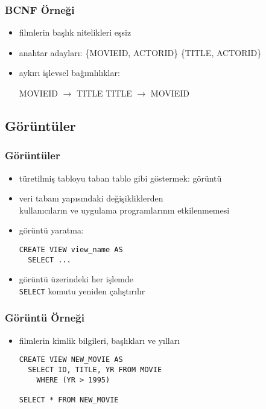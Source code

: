 \documentclass[dvipsnames]{beamer}
\theoremstyle{theorem}
\begin{document}
\begin{frame}
  \frametitle{BCNF Örneği}
  \hyperlink{example_db_1}{}

     \begin{itemize}  
       \item filmlerin başlık nitelikleri eşsiz
       \item anahtar adayları:
          \{MOVIEID, ACTORID\}
          \{TITLE, ACTORID\}
 

      \pause
      \medskip
      \item aykırı işlevsel bağımlılıklar:
 
         MOVIEID $\rightarrow$ TITLE
         TITLE $\rightarrow$ MOVIEID
    \end{itemize}
\end{frame}

\subsection{Görüntüler}

\lstset{language=ExtendedSQL}

\begin{frame}[fragile]
  \frametitle{Görüntüler}

  \begin{itemize}
    \item türetilmiş tabloyu taban tablo gibi göstermek: \alert{görüntü}
    \item veri tabanı yapısındaki değişikliklerden\\
      kullanıcıların ve uygulama programlarının etkilenmemesi

    \pause
    \bigskip
    \item görüntü yaratma:
    \begin{lstlisting}
CREATE VIEW view_name AS
  SELECT ...
    \end{lstlisting}

    \medskip
    \item görüntü üzerindeki her işlemde\\
      \lstinline!SELECT! komutu yeniden çalıştırılır
  \end{itemize}
\end{frame}

\begin{frame}[fragile]
  \frametitle{Görüntü Örneği}

  \begin{itemize}
    \item filmlerin kimlik bilgileri, başlıkları ve yılları

    \medskip
    \begin{lstlisting}
CREATE VIEW NEW_MOVIE AS
  SELECT ID, TITLE, YR FROM MOVIE
    WHERE (YR > 1995)

SELECT * FROM NEW_MOVIE
    \end{lstlisting}
  \end{itemize}
\end{frame}
\end{document}
